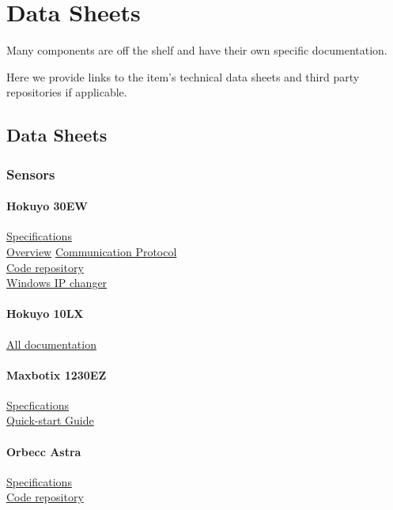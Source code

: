 \chapter{Data Sheets}\label{ch:datasheets}
Many components are off the shelf and have their own specific documentation.

Here we provide links to the item's technical data sheets and third party repositories if applicable.
\section{Data Sheets}
\subsection{Sensors} \label{sec:sensor_data_sheets}
\subsubsection{Hokuyo 30EW}
\href{http://www.robotshop.com/media/files/pdf2/utm-30lx-ew_specification.pdf}{Specifications} \\
\href{http://www.robotshop.com/media/files/pdf2/utm-30lx-ew_product_overview.pdf}{Overview}
\href{http://www.robotshop.com/media/files/pdf/communication-protocol-utm-30lx-ew.pdf}{Communication Protocol} \\
\href{http://wiki.ros.org/urg_node}{Code repository} \\
\href{http://www.robotshop.com/content/ZIP/ip-changer-utm-30lx-ew.zip}{Windows IP changer}
\subsubsection{Hokuyo 10LX}
\href{http://www.robotshop.com/media/files/zip/documentation-ust-10lx.zip}{All documentation} \\
\subsubsection{Maxbotix 1230EZ}
\href{https://www.maxbotix.com/documents/XL-MaxSonar-EZ_Datasheet.pdf}{Specfications} \\
\href{https://www.maxbotix.com/tutorials1/016-maxsonar-quick%E2%80%91start-guide.htm}{Quick-start Guide} \\

\subsubsection{Orbecc Astra}
\href{https://orbbec3d.com/product-astra/}{Specifications} \\
\href{http://wiki.ros.org/astra_camera}{Code repository} 

